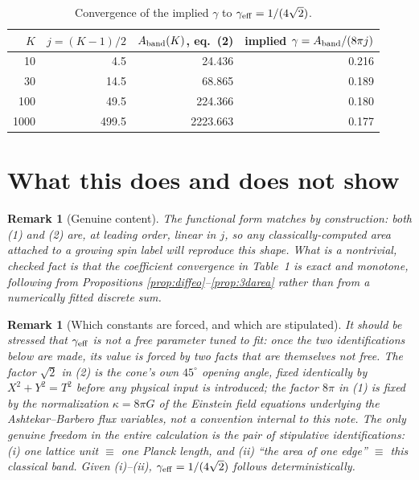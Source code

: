 \documentclass[11pt]{amsart}
\newtheorem{remark}[proposition]{Remark}
\theoremstyle{remark}
\begin{document}
\begin{table}[h]
\centering
\begin{tabular}{r r r r}
$K$ & $j=(K-1)/2$ & $A_{\rm band}(K)$, eq.\ (2) & implied $\gamma=A_{\rm band}/(8\pi j)$ \\
\hline
10 & 4.5 & 24.436 & 0.216 \\
30 & 14.5 & 68.865 & 0.189 \\
100 & 49.5 & 224.366 & 0.180 \\
1000 & 499.5 & 2223.663 & 0.177 \\
\end{tabular}
\caption{Convergence of the implied $\gamma$ to $\gamma_{\rm eff}=1/(4\sqrt2)$.}
\end{table}

\section{What this does and does not show}

\begin{remark}[Genuine content]
The functional form matches by construction: both (1) and (2) are, at leading order,
linear in $j$, so any classically-computed area attached to a growing spin label will
reproduce this shape. What is a nontrivial, checked fact is that the coefficient
convergence in Table~1 is exact and monotone, following from Propositions
\ref{prop:diffeo}--\ref{prop:3darea} rather than from a numerically fitted discrete sum.
\end{remark}

\begin{remark}[Which constants are forced, and which are stipulated]
It should be stressed that $\gamma_{\rm eff}$ is not a free parameter tuned to fit:
once the two identifications below are made, its value is forced by two facts that are
themselves not free. The factor $\sqrt2$ in (2) is the cone's own $45^\circ$ opening
angle, fixed identically by $X^2+Y^2=T^2$ before any physical input is introduced; the
factor $8\pi$ in (1) is fixed by the normalization $\kappa=8\pi G$ of the Einstein field
equations underlying the Ashtekar--Barbero flux variables, not a convention internal to
this note. The only genuine freedom in the entire calculation is the pair of
stipulative identifications: (i) one lattice unit $\equiv$ one Planck length, and (ii)
``the area of one edge'' $\equiv$ this classical band. Given (i)--(ii),
$\gamma_{\rm eff}=1/(4\sqrt2)$ follows deterministically.
\end{remark}
\end{document}
